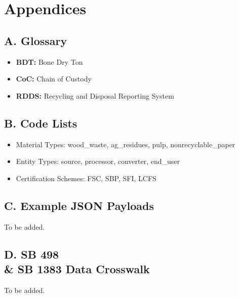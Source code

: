 \documentclass{article}
\begin{document}
\section{Appendices}
\subsection*{A. Glossary}
\begin{itemize}[noitemsep]
    \item \textbf{BDT:} Bone Dry Ton
    \item \textbf{CoC:} Chain of Custody
    \item \textbf{RDDS:} Recycling and Disposal Reporting System
\end{itemize}

\subsection*{B. Code Lists}
\begin{itemize}[noitemsep]
    \item Material Types: wood\_waste, ag\_residues, pulp, nonrecyclable\_paper
    \item Entity Types: source, processor, converter, end\_user
    \item Certification Schemes: FSC, SBP, SFI, LCFS
\end{itemize}

\subsection*{C. Example JSON Payloads}
To be added.

\subsection*{D. SB 498 \\& SB 1383 Data Crosswalk}
To be added.
\end{document}
